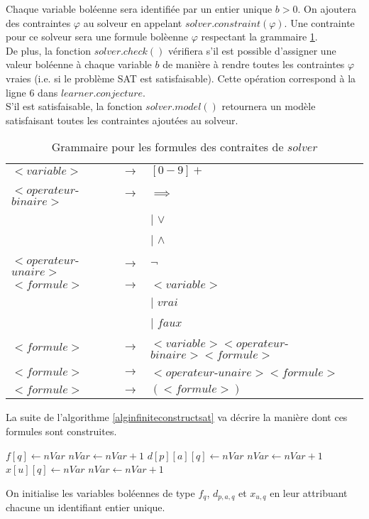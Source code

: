 \documentclass[12pt,a4paper,oneside,titlepage]{report}
\begin{document}
\noindent Chaque variable boléenne sera identifiée par un entier unique $b>
0$. On ajoutera des contraintes $\varphi$ au solveur en appelant $solver.constraint(\varphi)$. Une contrainte pour ce solveur sera une formule bolèenne $\varphi$ respectant la grammaire \ref{boolgrammar}.\\
De plus, la fonction $solver.check()$ vérifiera s'il est possible d'assigner une valeur boléenne à chaque variable $b$ de manière à rendre toutes les contraintes $\varphi$ vraies (i.e. si le problème SAT est satisfaisable). Cette opération correspond à la ligne $6$ dans $learner.conjecture$.\\
S'il est satisfaisable, la fonction $solver.model()$ retournera un modèle satisfaisant toutes les contraintes ajoutées au solveur.\\
\begin{center}
\begin{table}[H]
\begin{tabular}{|lcl|}
\hline
$<variable>$ &$\rightarrow$ & $[0-9]+$\\
$<operateur$-$binaire>$ & $\rightarrow$ 	& $\implies$\\
										&&$|$ $\lor$\\
										&&$|$ $\land$\\
$<operateur$-$unaire>$ & $\rightarrow$ 	& $\neg$\\
$<formule>$ & $\rightarrow$ & $<variable>$\\
								&& $|$ $vrai$\\
								&& $|$ $faux$\\			
$<formule>$ & $\rightarrow$ & $<variable><operateur$-$binaire><formule>$\\
$<formule>$ & $\rightarrow$ & $<operateur$-$unaire><formule>$\\
$<formule>$ & $\rightarrow$ & $(<formule>)$\\
\hline
\end{tabular}
\caption{\label{boolgrammar}Grammaire pour les formules des contraites de $solver$}
\end{table}
\end{center}
\noindent La suite de l'algorithme \ref{alginfiniteconstructsat} va décrire la manière dont ces formules sont construites.
\begin{algorithm}[H]
\begin{algorithmic}[1]
	\State $f[q]\gets nVar$
	\State $nVar\gets nVar+1$
\EndFor
{}
			\State $d[p][a][q]\gets nVar$
			\State $nVar\gets nVar+1$
		\EndFor
	\EndFor
\EndFor
{}
		\State $x[u][q]\gets nVar$
		\State $nVar\gets nVar+1$
	\EndFor
\EndFor
{}
\end{algorithmic}
\end{algorithm}
\noindent On initialise les variables boléennes de type $f_q$, $d_{p,a,q}$ et $x_{u,q}$ en leur attribuant chacune un identifiant entier unique.
\end{document}

